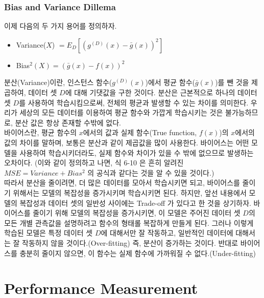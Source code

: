 \documentclass[a4paper]{oblivoir}
\begin{document}
\subsubsection{Bias and Variance Dillema}
이제 다음의 두 가지 용어를 정의하자.
\begin{itemize}
\item Variance($X$) $= E_{D}\left[\left(g^{(D)}(x) - \bar{g}(x) \right)^{2} \right]$
\item Bias$^{2}(X) = \left(\bar{g}(x)-f(x) \right)^{2}$
\end{itemize}

\indent 분산(Variance)이란, 인스턴스 함수($g^{(D)}(x)$)에서 평균 함수($\bar{g}(x)$)를 뺀 것을 제곱하여, 데이터 셋 $D$에 대해 기댓값을 구한 것이다. 분산은 근본적으로 하나의 데이터 셋 $D$를 사용하여 학습시킴으로써, 전체의 평균과 발생할 수 있는 차이를 의미한다. 우리가 세상의 모든 데이터를 이용하여 평균 함수와 가깝게 학습시키는 것은 불가능하므로, 분산 값은 항상 존재할 수밖에 없다. \\
\indent 바이어스란, 평균 함수의 $x$에서의 값과 실제 함수(True function, $f(x)$)의 $x$에서의 값의 차이를 말하며, 보통은 분산과 같이 제곱값을 많이 사용한다. 바이어스는 어떤 모델을 사용하여 학습시키더라도, 실제 함수와 차이가 있을 수 밖에 없으므로 발생하는 오차이다. (이와 같이 정의하고 나면, 식 6-10 은 흔히 알려진 $MSE = Variance + Bias^{2}$ 의 공식과 같다는 것을 알 수 있을 것이다.) \\
\indent 따라서 분산을 줄이려면, 더 많은 데이터를 모아서 학습시키면 되고, 바이어스를 줄이기 위해서는 모델의 복잡성을 증가시키며 학습시키면 된다. 하지만, 앞선 내용에서 모델의 복잡성과 데이터 셋의 일반성 사이에는 Trade-off 가 있다고 한 것을 상기하자. 바이어스를 줄이기 위해 모델의 복잡성을 증가시키면, 이 모델은 주어진 데이터 셋 $D$의 모든 개별 관측값을 설명하려고 함수의 형태롤 복잡하게 만들게 된다. 그러나 이렇게 학습된 모델은 특정 데이터 셋 $D$에 대해서만 잘 작동하고, 일반적인 데이터에 대해서는 잘 작동하지 않을 것이다.(Over-fitting) 즉, 분산이 증가하는 것이다. 반대로 바이어스를 충분히 줄이지 않으면, 이 함수는 실제 함수에 가까워질 수 없다.(Under-fitting)

\section{Performance Measurement}

\end{document}
